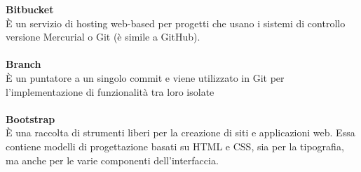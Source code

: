 \textbf{Bitbucket}\\
È un servizio di hosting web-based per progetti che usano i sistemi di controllo versione Mercurial o Git (è simile a GitHub). \\ \\
\textbf{Branch}\\
È un puntatore a un singolo commit e viene utilizzato in Git per l'implementazione di funzionalità tra loro isolate \\ \\
\textbf{Bootstrap}\\
È una raccolta di strumenti liberi per la creazione di siti e applicazioni web. Essa contiene modelli di progettazione basati su HTML e CSS, sia per la tipografia, ma anche per le varie componenti dell'interfaccia. \\ \\
\clearpage